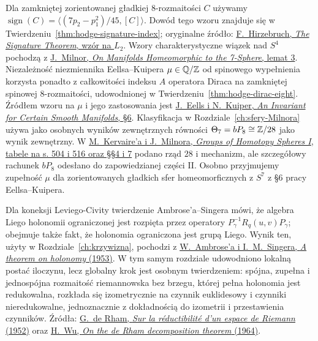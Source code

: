 \begin{description}[leftmargin=2.9cm,style=nextline]
\item[Sygnatura i sfery Milnora.]
  Dla zamkniętej zorientowanej gładkiej
  $8$-rozmaitości $C$ używamy
  $\operatorname{sign}(C)=
  \langle(7p_2-p_1^2)/45,[C]\rangle$.
  Dowód tego wzoru znajduje się w
  Twierdzeniu~\ref{thm:hodge-signature-index};
  oryginalne źródło:
  \href{https://webhomes.maths.ed.ac.uk/~v1ranick/papers/hirzrem.pdf}
  {F.\ Hirzebruch, \emph{The Signature Theorem},
  wzór na $L_2$}.
  Wzory charakterystyczne wiązek nad $S^4$ pochodzą z
  \href{https://sites.math.rutgers.edu/~feehan/teaching/math866/milnor7sphere.pdf}
  {J.\ Milnor, \emph{On Manifolds Homeomorphic
  to the 7-Sphere}, lemat 3}.
  Niezależność niezmiennika Eellsa--Kuipera
  $\mu\in\mathbb{Q}/\mathbb{Z}$ od spinowego wypełnienia korzysta ponadto
  z całkowitości indeksu $\widehat A$ operatora Diraca
  na zamkniętej spinowej $8$-rozmaitości, udowodnionej
  w Twierdzeniu~\ref{thm:hodge-dirac-eight}.
  Źródłem wzoru na $\mu$ i jego zastosowania jest
  \href{https://webhomes.maths.ed.ac.uk/~v1ranick/papers/eelskuip.pdf}
  {J.\ Eells i N.\ Kuiper, \emph{An Invariant for Certain
  Smooth Manifolds}, §6}. Klasyfikacja w
  Rozdziale~\ref{ch:sfery-Milnora} używa jako osobnych
  wyników zewnętrznych równości
  $\Theta_7=bP_8\cong\mathbb{Z}/28$ jako wynik zewnętrzny.
  W
  \href{https://www.sas.rochester.edu/mth/sites/doug-ravenel/otherpapers/kervaire-milnor.pdf}
  {M.\ Kervaire'a i J.\ Milnora, \emph{Groups of Homotopy
  Spheres I}, tabele na s. 504 i 516 oraz §§4 i 7}
  podano rząd $28$ i mechanizm, ale szczegółowy rachunek
  $bP_8$ odesłano do zapowiedzianej części II. Osobno
  przyjmujemy zupełność $\mu$ dla
  zorientowanych gładkich sfer homeomorficznych z $S^7$
  z §6 pracy Eellsa--Kuipera.

\item[Holonomia i globalny rozkład de Rhama.]
  Dla koneksji Leviego-Civity twierdzenie
  Ambrose'a--Singera mówi, że algebra Liego holonomii
  ograniczonej jest rozpięta przez operatory
  $P_\gamma^{-1}R_q(u,v)P_\gamma$; obejmuje także fakt,
  że holonomia ograniczona jest grupą Liego. Wynik ten,
  użyty w Rozdziale~\ref{ch:krzywizna}, pochodzi z
  \href{https://doi.org/10.1090/S0002-9947-1953-0063739-1}
  {W.\ Ambrose'a i I.~M.\ Singera,
  \emph{A theorem on holonomy} (1953)}.
  W tym samym rozdziale udowodniono lokalną postać
  iloczynu, lecz globalny krok jest osobnym twierdzeniem:
  spójna, zupełna i jednospójna rozmaitość riemannowska
  bez brzegu, której pełna holonomia jest redukowalna,
  rozkłada się izometrycznie na czynnik euklidesowy
  i czynniki nieredukowalne, jednoznacznie z dokładnością
  do izometrii i przestawienia czynników. Źródła:
  \href{https://doi.org/10.1007/BF02564308}
  {G.\ de Rham, \emph{Sur la réductibilité d'un espace
  de Riemann} (1952)} oraz
  \href{https://doi.org/10.1215/ijm/1256059674}
  {H.\ Wu, \emph{On the de Rham decomposition theorem}
  (1964)}.


\end{description}
